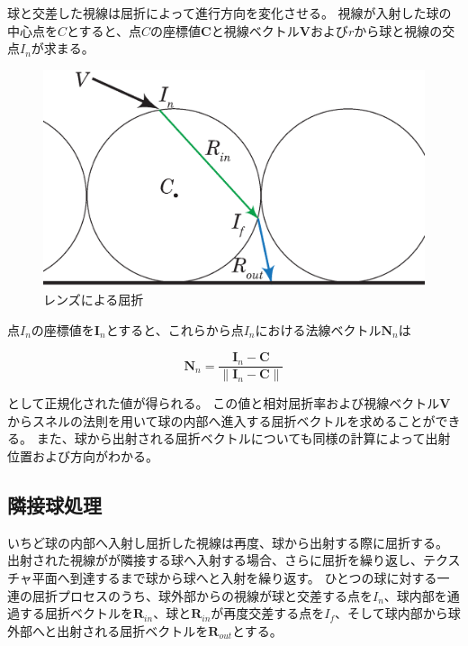 球と交差した視線は屈折によって進行方向を変化させる。
視線が入射した球の中心点を$C$とすると、点$C$の座標値$\bm{C}$と視線ベクトル$\bm{V}$および$r$から球と視線の交点$I_n$が求まる。
\begin{figure}[h]
  \centering
  \includegraphics[width=4.5in]{./img/sphere_refract.eps}
  \caption{レンズによる屈折}
  \label{FSphereRefract}
\end{figure}
点$I_n$の座標値を$\bm{I}_n$とすると、これらから点$I_n$における法線ベクトル$\bm{N}_n$は

\begin{equation}
\label{ENd}
\bm{N}_n = \frac{\bm{I}_n - \bm{C}}{\|\bm{I}_n - \bm{C}\|}
\end{equation}

\noindent
として正規化された値が得られる。
この値と相対屈折率および視線ベクトル$\bm{V}$からスネルの法則を用いて球の内部へ進入する屈折ベクトルを求めることができる。
また、球から出射される屈折ベクトルについても同様の計算によって出射位置および方向がわかる。

\subsection{隣接球処理}
\label{SSMultiRefraction}

いちど球の内部へ入射し屈折した視線は再度、球から出射する際に屈折する。
出射された視線がが隣接する球へ入射する場合、さらに屈折を繰り返し、テクスチャ平面へ到達するまで球から球へと入射を繰り返す。
ひとつの球に対する一連の屈折プロセスのうち、球外部からの視線が球と交差する点を$I_n$、球内部を通過する屈折ベクトルを$\bm{R}_{in}$、球と$\bm{R}_{in}$が再度交差する点を$I_f$、そして球内部から球外部へと出射される屈折ベクトルを$\bm{R}_{out}$とする。

